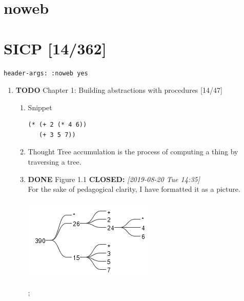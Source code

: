 \documentclass[11pt]{article}
\author{Vladimir Nikishkin}
\date{\today}
\title{}
\begin{document}
\tableofcontents



\section{noweb}
\label{sec:org44d37e9}
\section{SICP [14/362]}
\label{sec:org4c30d44}
\begin{verbatim}
header-args: :noweb yes
\end{verbatim}

\begin{enumerate}
\item {\bfseries\sffamily TODO} Chapter 1: Building abstractions with procedures [14/47]
\label{sec:orgf001285}
\begin{enumerate}
\item Snippet
\label{sec:org8bbb6b9}
\lstset{language=Lisp,label= ,caption= ,captionpos=b,numbers=none}
\begin{lstlisting}
(* (+ 2 (* 4 6))
   (+ 3 5 7))
\end{lstlisting}

\item Thought
\label{sec:orgda4fa63}
Tree accumulation is the process of computing a thing by traversing a tree.

\item {\bfseries\sffamily DONE} Figure 1.1
\label{sec:org2768e20}
\noindent\textbf{CLOSED:} \textit{[2019-08-20 Tue 14:35]}\\
For the sake of pedagogical clarity, I have formatted it as a picture.
\begin{center}
\includegraphics[width=.9\linewidth]{figure-1-1-mm.png}
\end{center}
;


\end{enumerate}
\end{enumerate}
\end{document}
